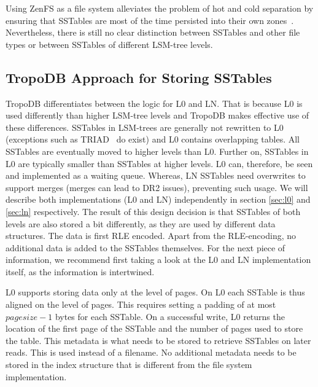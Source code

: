 Using ZenFS as a file system alleviates the problem of hot and cold separation by ensuring that SSTables are most of the time persisted into their own zones~\cite{bjorling2021zns}. Nevertheless, there is still no clear distinction between SSTables and other file types or between SSTables of different LSM-tree levels.

\subsection{TropoDB Approach for Storing SSTables}
TropoDB differentiates between the logic for L0 and LN. That is because L0 is used differently than higher LSM-tree levels and TropoDB makes effective use of these differences. SSTables in LSM-trees are generally not rewritten to L0 (exceptions such as TRIAD~\cite{balmau2017triad} do exist) and L0 contains overlapping tables. All SSTables are eventually moved to higher levels than L0. Further on, SSTables in L0 are typically smaller than SSTables at higher levels. L0 can, therefore, be seen and implemented as a waiting queue. Whereas, LN SSTables need overwrites to support merges (merges can lead to DR2 issues), preventing such usage. We will describe both implementations (L0 and LN) independently in section \autoref{sec:l0} and \autoref{sec:ln} respectively. The result of this design decision is that SSTables of both levels are also stored a bit differently, as they are used by different data structures. The data is first RLE encoded. Apart from the RLE-encoding, no additional data is added to the SSTables themselves. For the next piece of information, we recommend first taking a look at the L0 and LN implementation itself, as the information is intertwined.

L0 supports storing data only at the level of pages. On L0 each SSTable is thus aligned on the level of pages. This requires setting a padding of at most $pagesize-1$ bytes for each SSTable. On a successful write, L0 returns the location of the first page of the SSTable and the number of pages used to store the table. This metadata is what needs to be stored to retrieve SSTables on later reads. This is used instead of a filename. No additional metadata needs to be stored in the index structure that is different from the file system implementation.

